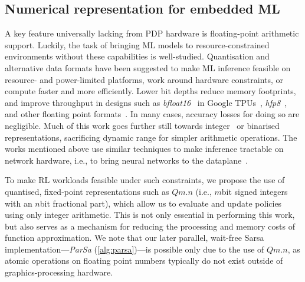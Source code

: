 \documentclass[
sigconf,natbib=false
]{acmart}
\newcounter{insightc}
\newenvironment{insight}
	{
		\begin{tipblock}\refstepcounter{insightc}\textbf{Insight \theinsightc:}\em
	}
	{
		\end{tipblock}
	}
\begin{document}

\subsection{Numerical representation for embedded ML}
A key feature universally lacking from PDP hardware is floating-point arithmetic support.
Luckily, the task of bringing ML models to resource-constrained environments without these capabilities is well-studied.
Quantisation and alternative data formats have been suggested to make ML inference feasible on resource- and power-limited platforms, work around hardware constraints, or compute faster and more efficiently.
Lower bit depths reduce memory footprints, and improve throughput in designs such as \emph{bfloat16}~\parencite{bfloat16-blog} in Google TPUs~\parencite{DBLP:journals/sigops/XieDMKVZT18}, \emph{hfp8}~\parencite{DBLP:conf/nips/SunCCWVSCZG19}, and other floating point formats~\parencite{DBLP:journals/corr/abs-2007-01530}.
In many cases, accuracy losses for doing so are negligible.
Much of this work goes further still towards integer~\parencite{tensorrt-8bit} or binarised~\parencite{DBLP:journals/corr/MiyashitaLM16,DBLP:conf/eccv/RastegariORF16,DBLP:journals/corr/KimS16,DBLP:conf/nips/HubaraCSEB16} representations, sacrificing dynamic range for simpler arithmetic operations.
The works mentioned above use similar techniques to make inference tractable on network hardware, i.e., to bring neural networks to the dataplane~\parencite{DBLP:journals/corr/abs-2009-02353,DBLP:conf/sigcomm/SanvitoSB18,DBLP:journals/corr/abs-1801-05731}.

To make RL workloads feasible under such constraints, we propose the use of quantised, fixed-point representations such as $Qm.n$ (i.e., $m$\si{bit} signed integers with an $n$\si{bit} fractional part), which allow us to evaluate and update policies using only integer arithmetic.
This is not only essential in performing this work, but also serves as a mechanism for reducing the processing and memory costs of function approximation.
We note that our later parallel, wait-free Sarsa implementation---\emph{ParSa} (\cref{alg:parsa})---is possible only due to the use of $Qm.n$, as atomic operations on floating point numbers typically do not exist outside of graphics-processing hardware.
\end{document}
